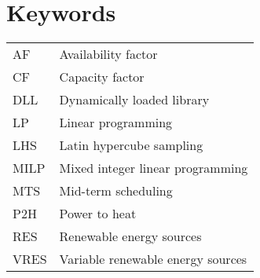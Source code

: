 \newpage

\tableofcontents

\newpage

\section*{Keywords}


\begin{table}[h!]
    \begin{tabular}{p{3cm} p{8cm}}
        AF & Availability factor \\
        CF & Capacity factor \\
        DLL & Dynamically loaded library \\
        LP & Linear programming \\
        LHS & Latin hypercube sampling \\
        MILP & Mixed integer linear programming \\
        MTS & Mid-term scheduling \\
        P2H & Power to heat \\
        RES & Renewable energy sources \\
        VRES & Variable renewable energy sources \\
    \end{tabular}
\end{table}

\newpage
